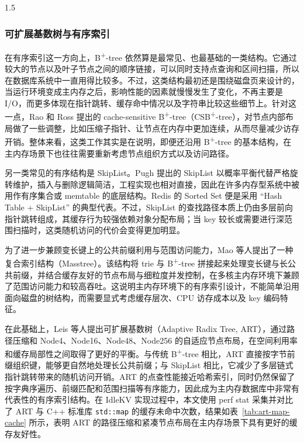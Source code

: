\documentclass[a4paper,12pt,fontset=none,twoside]{article}
\numberwithin{figure}{section}
\numberwithin{equation}{section}
\numberwithin{table}{section}
\begin{document}
\begin{spacing}{1.5}
	\subsubsection{可扩展基数树与有序索引}

	在有序索引这一方向上，B\textsuperscript{+}-tree 依然算是最常见、也最基础的一类结构。它通过较大的节点以及叶子节点之间的顺序链接，可以同时支持点查询和区间扫描，所以在数据库系统中一直用得比较多。不过，这类结构最初还是围绕磁盘页来设计的，当运行环境变成主内存之后，影响性能的因素就慢慢发生了变化，不再主要是 I/O，而更多体现在指针跳转、缓存命中情况以及字符串比较这些细节上。针对这一点，Rao 和 Ross 提出的 cache-sensitive B\textsuperscript{+}-tree（CSB\textsuperscript{+}-tree）\cite{Making-B-Trees-Cache-Conscious-in-Main-Memory}，对节点内部布局做了一些调整，比如压缩子指针、让节点在内存中更加连续，从而尽量减少访存开销。整体来看，这类工作其实是在说明，即便还沿用 B\textsuperscript{+}-tree 的基本结构，在主内存场景下也往往需要重新考虑节点组织方式以及访问路径。

	另一类常见的有序结构是 SkipList。Pugh 提出的 SkipList\cite{Skip-lists-a-probabilistic-alternative-to-balanced-trees} 以概率平衡代替严格旋转维护，插入与删除逻辑简洁，工程实现也相对直接，因此在许多内存型系统中被用作有序集合或 memtable 的底层结构。Redis 的 Sorted Set 便是采用 “Hash Table + SkipList” 的典型代表。不过，SkipList 的查找路径本质上仍由多层前向指针跳转组成，其缓存行为较强依赖对象分配布局；当 key 较长或需要进行深范围扫描时，这类随机访问的代价会变得更加明显。

		为了进一步兼顾变长键上的公共前缀利用与范围访问能力，Mao 等人提出了一种复合索引结构（Masstree）\cite{Cache-Craftiness-for-Fast-Multicore-Key-Value-Storage}。该结构将 trie 与 B\textsuperscript{+}-tree 拼接起来处理变长键与长公共前缀，并结合缓存友好的节点布局与细粒度并发控制，在多核主内存环境下兼顾了范围访问能力和较高吞吐。这说明主内存环境下的有序索引设计，不能简单沿用面向磁盘的树结构，而需要显式考虑缓存层次、CPU 访存成本以及 key 编码特征。

	在此基础上，Leis 等人提出可扩展基数树（Adaptive Radix Tree, ART）\cite{The-adaptive-radix-tree-ARTful-indexing-for-main-memory-databases}，通过路径压缩和 Node4、Node16、Node48、Node256 的自适应节点布局，在空间利用率和缓存局部性之间取得了更好的平衡。与传统 B\textsuperscript{+}-tree 相比，ART 直接按字节前缀组织键，能够更自然地处理长公共前缀；与 SkipList 相比，它减少了多层链式指针跳转带来的随机访问开销。ART 的点查性能接近哈希索引，同时仍然保留了按字典序遍历、前缀匹配和范围扫描等有序能力，因此成为主内存数据库中非常有代表性的有序索引结构。在 IdleKV 实现过程中，本文使用 perf stat 采集并对比了 ART 与 C++ 标准库 \texttt{std::map} 的缓存未命中次数，结果如表~\ref{tab:art-map-cache} 所示，表明 ART 的路径压缩和紧凑节点布局在主内存场景下具有更好的缓存友好性。


\end{spacing}
\end{document}
